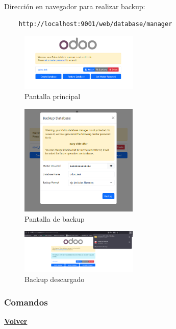 \documentclass[a4paper,12pt]{article}
\begin{document}
Dirección en navegador para realizar backup:
\begin{verbatim}
    http://localhost:9001/web/database/manager
\end{verbatim}


\begin{figure}[h!]
    \centering
    \includegraphics[width=0.5\textwidth]{pr2odoo76-backupInterfazPrincipal.png}
    \caption{Pantalla principal}
\end{figure}
\FloatBarrier

\begin{figure}[h!]
    \centering
    \includegraphics[width=0.5\textwidth]{pr2odoo77-backupInterfazPantallaCambio.png}
    \caption{Pantalla de backup}
\end{figure}
\FloatBarrier

\begin{figure}[h!]
    \centering
    \includegraphics[width=0.5\textwidth]{pr2odoo78-backupInterfazDescargado.png}
    \caption{Backup descargado}
\end{figure}
\FloatBarrier

\subsubsection{Comandos}
\hyperlink{anchor-indice}{\textbf{Volver}}\\
\end{document}
